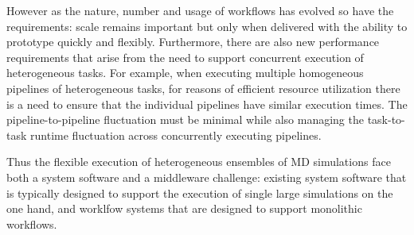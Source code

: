 However as the nature, number and usage of workflows has evolved so have the
requirements: scale remains important but only when delivered with the ability
to prototype quickly and flexibly. Furthermore, there are also new performance
requirements that arise from the need to support concurrent execution of
heterogeneous tasks. For example, when executing multiple homogeneous
pipelines of heterogeneous tasks, for reasons of efficient resource
utilization there is a need to ensure that the individual pipelines have
similar execution times. The pipeline-to-pipeline fluctuation must be minimal
while also managing the task-to-task runtime fluctuation across concurrently
executing pipelines.

Thus the flexible execution of heterogeneous ensembles of MD simulations face
both a system software and a middleware challenge: existing system software
that is typically designed to support the execution of single large
simulations on the one hand, and worklfow systems that are designed to support
monolithic workflows.










